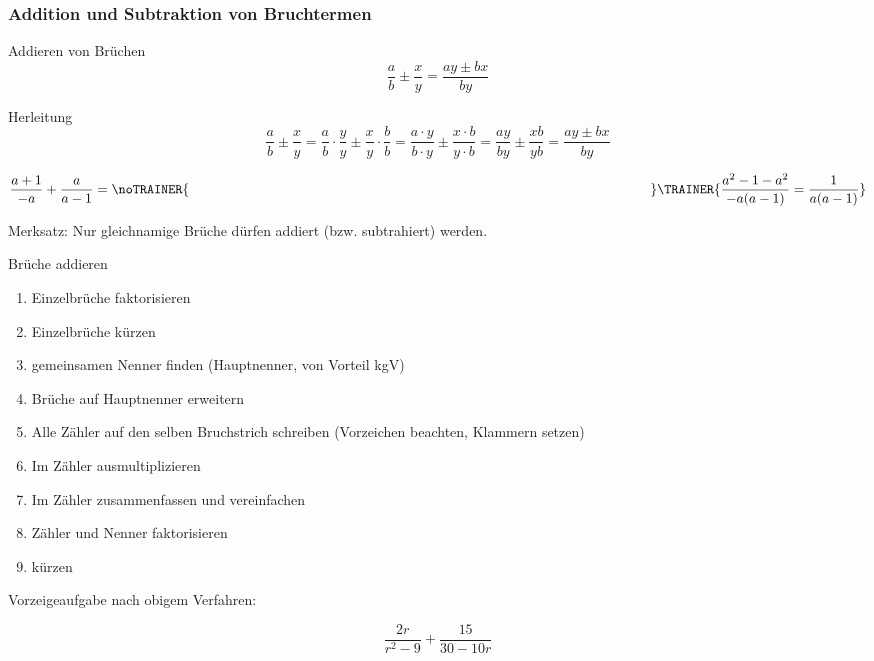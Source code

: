 \subsubsection{Addition und Subtraktion von Bruchtermen}

\begin{gesetz}{Addieren von Brüchen}{}
$$\frac{a}{b}\pm\frac{x}{y} = \frac{ay\pm{}bx}{by}$$
\end{gesetz}

Herleitung
$$\frac{a}{b}\pm\frac{x}{y} = \frac{a}{b}\cdot\frac{y}{y} \pm \frac{x}{y}\cdot\frac{b}{b} =
\frac{a\cdot y}{b\cdot y}\pm \frac{x\cdot b}{y \cdot b} = \frac{ay}{by}\pm\frac{xb}{yb} = \frac{ay\pm{}bx}{by}$$

\begin{beispiel}{}{}
$$\frac{a+1}{-a} + \frac{a}{a-1} = \noTRAINER{\hspace{12cm}}\TRAINER{\frac{a^2 - 1 - a^2}{-a(a-1)} = \frac{1}{a(a-1)}}$$
\end{beispiel}

\begin{gesetz}{}{}
Merksatz: Nur gleichnamige Brüche dürfen addiert (bzw. subtrahiert)
werden.
\end{gesetz}
\newpage


\begin{rezept}{Brüche addieren}{}
\begin{enumerate}
	\item Einzelbrüche faktorisieren
	\item Einzelbrüche kürzen
	\item gemeinsamen Nenner finden (Hauptnenner, von Vorteil kgV)
	\item Brüche auf Hauptnenner erweitern
	\item Alle Zähler auf den selben Bruchstrich schreiben (Vorzeichen beachten, Klammern setzen)
	\item Im Zähler ausmultiplizieren
	\item Im Zähler zusammenfassen und vereinfachen
	\item Zähler und Nenner faktorisieren
	\item kürzen
\end{enumerate}
\end{rezept}
\newpage

Vorzeigeaufgabe nach obigem Verfahren:

$$\frac{2r}{r^2-9} + \frac{15}{30-10r}$$

